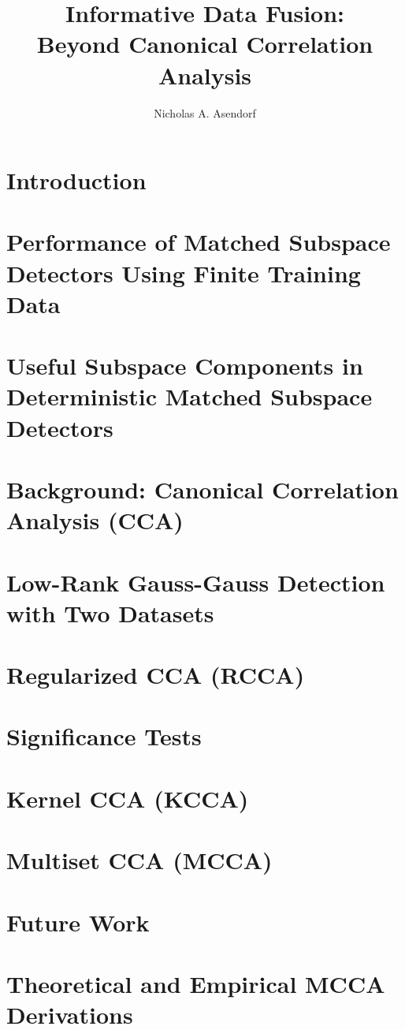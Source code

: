 \documentclass[thesis]{thesis-umich}
\author{Nicholas A. Asendorf}
\title{Informative Data Fusion:\\ Beyond Canonical Correlation Analysis}
\begin{document}
\chapter{Introduction}\label{sec:intro}



\chapter{Performance of Matched Subspace Detectors Using Finite Training Data}


\chapter{Useful Subspace Components in Deterministic Matched Subspace
  Detectors}\label{sec:taes_useful}


\chapter{Background: Canonical Correlation Analysis (CCA)}\label{sec:cca}


\chapter{Low-Rank Gauss-Gauss Detection with Two Datasets}\label{sec:cca_detec}


\chapter{Regularized CCA (RCCA)}\label{sec:rcca}


\chapter{Significance Tests}\label{sec:sig_tests}


\chapter{Kernel CCA (KCCA)}\label{sec:kcca}


\chapter{Multiset CCA (MCCA)}\label{sec:mcca}


\chapter{Future Work}\label{sec:fw}


 \appendix

\chapter{Theoretical and Empirical MCCA Derivations}\label{sec:mcca_derivs}
 



\end{document}
